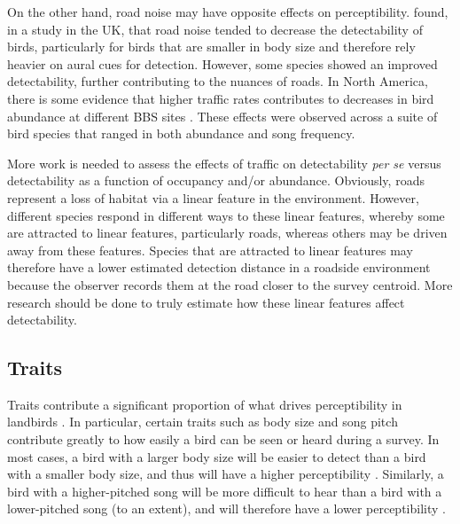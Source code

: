 \par On the other hand, road noise may have opposite effects on perceptibility.
\citet{cooke_road_2020} found, in a study in the UK, that road noise tended to decrease the detectability of birds, particularly for birds that are smaller in body size and therefore rely heavier on aural cues for detection.
However, some species showed an improved detectability, further contributing to the nuances of roads.
In North America, there is some evidence that higher traffic rates contributes to decreases in bird abundance at different BBS sites \citep{griffith_traffic_2010}.
These effects were observed across a suite of bird species that ranged in both abundance and song frequency.

\par More work is needed to assess the effects of traffic on detectability \textit{per se} versus detectability as a function of occupancy and/or abundance.
Obviously, roads represent a loss of habitat via a linear feature in the environment.
However, different species respond in different ways to these linear features, whereby some are attracted to linear features, particularly roads, whereas others may be driven away from these features.
Species that are attracted to linear features may therefore have a lower estimated detection distance in a roadside environment because the observer records them at the road closer to the survey centroid.
More research should be done to truly estimate how these linear features affect detectability.

\subsection{Traits}

\par Traits contribute a significant proportion of what drives perceptibility in landbirds \citep{seoane_species-specific_2005, garrard_general_2013, denis_biological_2017, johnston_species_2014, solymos_phylogeny_2018}.
In particular, certain traits such as body size and song pitch contribute greatly to how easily a bird can be seen or heard during a survey.
In most cases, a bird with a larger body size will be easier to detect than a bird with a smaller body size, and thus will have a higher perceptibility \citep{bowman_adaptive_1979, fletcher_acoustics_1999}.
Similarly, a bird with a higher-pitched song will be more difficult to hear than a bird with a lower-pitched song (to an extent), and will therefore have a lower perceptibility \citep{morton_ecological_1975}.

